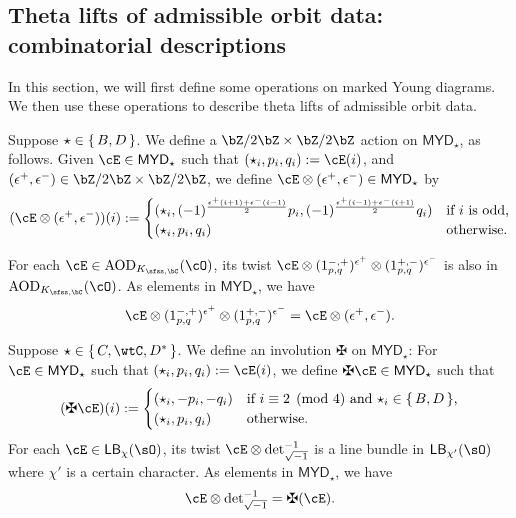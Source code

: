 \documentclass[12pt,a4paper]{amsart}
\def\MYD{{\mathsf{MYD}}}
\numberwithin{equation}{section}
\theoremstyle{remark}
\begin{document}
\subsection{Theta lifts of admissible orbit data: combinatorial descriptions}
In this section, we will first define some operations on marked Young diagrams. We then use these operations to describe theta lifts of admissible orbit data.

\smallskip

Suppose $\star\in \set{B,D}$. We define a $\bZ/2\bZ\times \bZ/2\bZ$ action on
$\MYD_{\star}$, as follows. Given $\cE\in \MYD_{\star}$ such that $(\star_{i},p_{i},q_{i}):=\cE(i)$, and $(\epsilon^{+},\epsilon^{-})\in \bZ/2\bZ\times \bZ/2\bZ$,
we define
$\cE \lotimes (\epsilon^{+},\epsilon^{-})\in \MYD_{\star}$ by
\[
(\cE \lotimes(\epsilon^{+},\epsilon^{-}))(i) := \begin{cases}
  (\star_{i}, (-1)^{\frac{\epsilon^{+}(i+1)+\epsilon^{-}(i-1)}{2}}p_{i},(-1)^{\frac{\epsilon^{+}(i-1)+\epsilon^{-}(i+1)}{2}}q_{i})
  & \text{if $i$  is odd,}\\
  (\star_{i}, p_{i},q_{i}) & \text{otherwise.}
\end{cases}
\]

For each $\cE\in \AOD_{\Ks}(\cO)$, its twist
$\cE\otimes  (1^{{-,+}}_{p,q})^{\epsilon^{+}}\otimes (
  1^{+,-}_{p,q})^{\epsilon^{-}}$
is also  in $\AOD_{\Ks}(\cO)$.
As elements in $\MYD_{\star}$, we have
\[
  \cE\otimes  (1^{{-,+}}_{p,q})^{\epsilon^{+}}\otimes (1^{+,-}_{p,q})^{\epsilon^{-}} = \cE \otimes (\epsilon^{+},\epsilon^{-}).
\]

\medskip

Suppose $\star\in \set{C,\wtC,D^{*}}$. We define an involution $\maltese$ on
$\MYD_{\star}$:
For $\cE\in \MYD_{\star}$ such that $(\star_{i},p_{i},q_{i}):=\cE(i)$,
we define $\maltese\cE\in \MYD_{\star}$ such that
\[
(\maltese\cE)(i) := \begin{cases}
  (\star_{i}, -p_{i},-q_{i})& \text{if $i\equiv 2 \pmod{4}$ and $\star_{i}\in \set{B,D}$,}\\
  (\star_{i}, p_{i},q_{i}) & \text{otherwise.}
\end{cases}
\]
For each $\cE\in \DCO{\chi}$, its twist $\cE\otimes \deti^{-1}$
is a line bundle  in $\DCO{\chi'}$ where  $\chi'$ is a certain character. %
As elements in $\MYD_{\star}$, we have
\[
  \cE\otimes \deti^{-1} = \maltese (\cE).
\]
\end{document}
